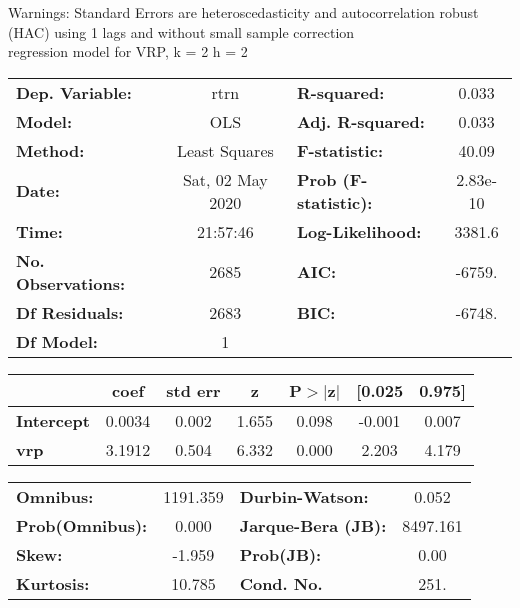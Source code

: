 Warnings: \newline
 [1] Standard Errors are heteroscedasticity and autocorrelation robust (HAC) using 1 lags and without small sample correction\\ 

regression model for VRP, k = 2 h = 2\begin{center}
\begin{tabular}{lclc}
\toprule
\textbf{Dep. Variable:}    &       rtrn       & \textbf{  R-squared:         } &     0.033   \\
\textbf{Model:}            &       OLS        & \textbf{  Adj. R-squared:    } &     0.033   \\
\textbf{Method:}           &  Least Squares   & \textbf{  F-statistic:       } &     40.09   \\
\textbf{Date:}             & Sat, 02 May 2020 & \textbf{  Prob (F-statistic):} &  2.83e-10   \\
\textbf{Time:}             &     21:57:46     & \textbf{  Log-Likelihood:    } &    3381.6   \\
\textbf{No. Observations:} &        2685      & \textbf{  AIC:               } &    -6759.   \\
\textbf{Df Residuals:}     &        2683      & \textbf{  BIC:               } &    -6748.   \\
\textbf{Df Model:}         &           1      & \textbf{                     } &             \\
\bottomrule
\end{tabular}
\begin{tabular}{lcccccc}
                   & \textbf{coef} & \textbf{std err} & \textbf{z} & \textbf{P$> |$z$|$} & \textbf{[0.025} & \textbf{0.975]}  \\
\midrule
\textbf{Intercept} &       0.0034  &        0.002     &     1.655  &         0.098        &       -0.001    &        0.007     \\
\textbf{vrp}       &       3.1912  &        0.504     &     6.332  &         0.000        &        2.203    &        4.179     \\
\bottomrule
\end{tabular}
\begin{tabular}{lclc}
\textbf{Omnibus:}       & 1191.359 & \textbf{  Durbin-Watson:     } &    0.052  \\
\textbf{Prob(Omnibus):} &   0.000  & \textbf{  Jarque-Bera (JB):  } & 8497.161  \\
\textbf{Skew:}          &  -1.959  & \textbf{  Prob(JB):          } &     0.00  \\
\textbf{Kurtosis:}      &  10.785  & \textbf{  Cond. No.          } &     251.  \\
\bottomrule
\end{tabular}
\end{center}

